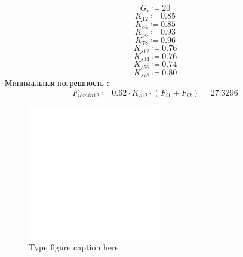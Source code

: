\documentclass{article}
\newcommand{\defeq}{\coloneq} %
\begin{document}
\begin{equation*}
G_{r} \defeq 20
\end{equation*}
\begin{equation*}
\textit{K}_{\textit{12}} \defeq 0.85
\end{equation*}
\begin{equation*}
\textit{K}_{\textit{34}} \defeq 0.85
\end{equation*}
\begin{equation*}
\textit{K}_{\textit{56}} \defeq 0.93
\end{equation*}
\begin{equation*}
\textit{K}_{\textit{78}} \defeq 0.96
\end{equation*}
\begin{equation*}
\textit{K}_{\textit{s12}} \defeq 0.76
\end{equation*}
\begin{equation*}
\textit{K}_{\textit{s34}} \defeq 0.76
\end{equation*}
\begin{equation*}
\textit{K}_{\textit{s56}} \defeq 0.74
\end{equation*}
\begin{equation*}
\textit{K}_{\textit{s78}} \defeq 0.80
\end{equation*}
\colorbox[HTML]{000000}{Минимальная погрешность :}\newline
\begin{equation*}
\textit{F}_{\textit{iomin12}} \defeq 0.62 \cdot \textit{K}_{\textit{s12}} \cdot \left( \textit{F}_{\textit{i1}}+\textit{F}_{\textit{i2}} \right) = {27.3296}
\end{equation*}
\begin{figure}[h!]
 \begin{center}
  \includegraphics[max width=\textwidth]{calculations/814.png}
  \caption{Type figure caption here}
  \label{fig:814}
 \end{center}
\end{figure}
\end{document}
